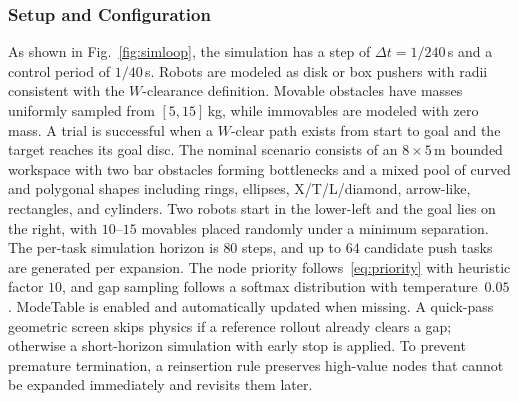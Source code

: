 \subsubsection{Setup and Configuration}\label{subsec:sim-setup}
As shown in Fig.~\ref{fig:simloop},
the simulation has a step of $\Delta t=1/240$\,s and a control period of $1/40$\,s. Robots
are modeled as disk or box pushers with radii consistent with the $W$-clearance definition. Movable
obstacles have masses uniformly sampled from $[5,15]$\,kg, while immovables are modeled with zero
mass. A trial is successful when a $W$-clear path exists from start to goal and the target reaches
its goal disc. The nominal scenario consists of an $8{\times}5$\,m bounded workspace with two bar
obstacles forming bottlenecks and a mixed pool of curved and polygonal shapes including rings,
ellipses, X/T/L/diamond, arrow-like, rectangles, and cylinders. Two robots start in the lower-left
and the goal lies on the right, with $10$--$15$ movables placed randomly under a minimum separation.
The per-task simulation horizon is $80$ steps, and up to $64$ candidate push tasks are generated per
expansion. The node priority follows~\eqref{eq:priority} with heuristic factor
$10$, and gap sampling follows a softmax distribution with temperature~$0.05$. ModeTable is enabled
and automatically updated when missing. A quick-pass geometric screen skips physics if a reference
rollout already clears a gap; otherwise a short-horizon simulation with early stop is applied. To
prevent premature termination, a reinsertion rule preserves high-value nodes that cannot be
expanded immediately and revisits them later.

